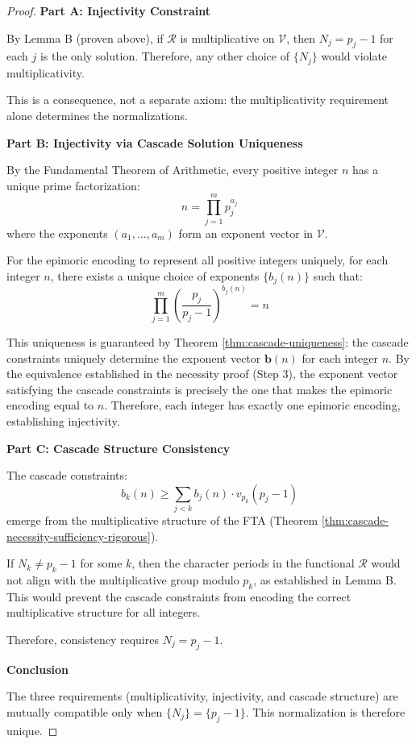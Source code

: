 \begin{proof}

\noindent \textbf{Part A: Injectivity Constraint}

By Lemma B (proven above), if $\mathcal{R}$ is multiplicative on $\mathcal{V}$, then $N_j = p_j - 1$ for each $j$ is the only solution. Therefore, any other choice of $\{N_j\}$ would violate multiplicativity.

This is a consequence, not a separate axiom: the multiplicativity requirement alone determines the normalizations.

\noindent \textbf{Part B: Injectivity via Cascade Solution Uniqueness}

By the Fundamental Theorem of Arithmetic, every positive integer $n$ has a unique prime factorization:
\begin{equation}
n = \prod_{j=1}^m p_j^{a_j}
\end{equation}
where the exponents $(a_1, \ldots, a_m)$ form an exponent vector in $\mathcal{V}$.

For the epimoric encoding to represent all positive integers uniquely, for each integer $n$, there exists a unique choice of exponents $\{b_j(n)\}$ such that:
\begin{equation}
\prod_{j=1}^m \left(\frac{p_j}{p_j - 1}\right)^{b_j(n)} = n
\end{equation}

This uniqueness is guaranteed by Theorem \ref{thm:cascade-uniqueness}: the cascade constraints uniquely determine the exponent vector $\mathbf{b}(n)$ for each integer $n$. By the equivalence established in the necessity proof (Step 3), the exponent vector satisfying the cascade constraints is precisely the one that makes the epimoric encoding equal to $n$. Therefore, each integer has exactly one epimoric encoding, establishing injectivity.

\noindent \textbf{Part C: Cascade Structure Consistency}

The cascade constraints:
\begin{equation}
b_k(n) \geq \sum_{j < k} b_j(n) \cdot v_{p_k}(p_j - 1)
\end{equation}
emerge from the multiplicative structure of the FTA (Theorem \ref{thm:cascade-necessity-sufficiency-rigorous}).

If $N_k \neq p_k - 1$ for some $k$, then the character periods in the functional $\mathcal{R}$ would not align with the multiplicative group modulo $p_k$, as established in Lemma B. This would prevent the cascade constraints from encoding the correct multiplicative structure for all integers.

Therefore, consistency requires $N_j = p_j - 1$.

\noindent \textbf{Conclusion}

The three requirements (multiplicativity, injectivity, and cascade structure) are mutually compatible only when $\{N_j\} = \{p_j - 1\}$. This normalization is therefore unique.

\end{proof}

